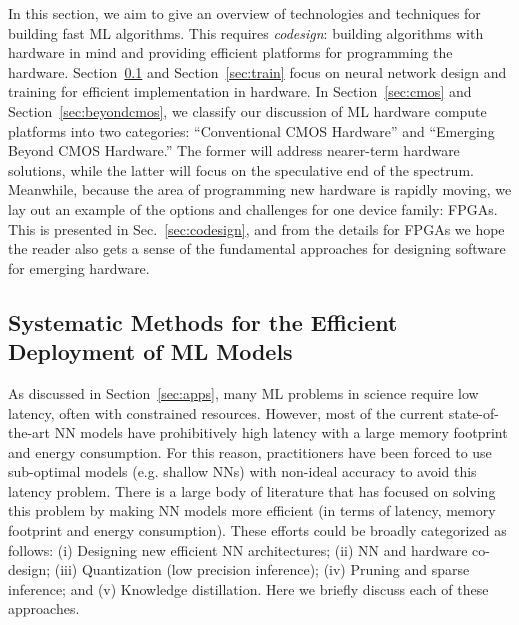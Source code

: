 In this section, we aim to give an overview of technologies and techniques for building fast ML algorithms. 
This requires {\it codesign}: building algorithms with hardware in mind and providing efficient platforms for programming the hardware.  Section~\ref{sec:deploy} and Section~\ref{sec:train} focus on neural network design and training for efficient implementation in hardware. 
In Section~\ref{sec:cmos} and Section~\ref{sec:beyondcmos}, we classify our discussion of ML hardware compute platforms into two categories: ``Conventional CMOS Hardware'' and ``Emerging Beyond CMOS Hardware.''  
The former will address nearer-term hardware solutions, while the latter will focus on the speculative end of the spectrum. Meanwhile, because the area of programming new hardware is rapidly moving, we lay out an example of the options and challenges for one device family: FPGAs. 
This is presented in Sec.~\ref{sec:codesign}, and from the details for FPGAs we hope the reader also gets a sense of the fundamental approaches for designing software for emerging hardware.   


\subsection{Systematic Methods for the Efficient Deployment of ML Models}
\label{sec:deploy}

As discussed in Section~\ref{sec:apps}, many ML problems in science
require low latency, often with
constrained resources. However, most of the current state-of-the-art NN models have prohibitively high latency with a large
memory footprint and energy consumption. 
For this reason, practitioners have been forced to use sub-optimal models (e.g. shallow NNs)
with non-ideal accuracy to avoid this latency problem.
There is a large body of literature that has
focused on solving this problem by making NN models more efficient
(in terms of latency, memory footprint and energy consumption). These efforts could be broadly categorized as follows:
(i) Designing new efficient NN architectures;
(ii) NN and hardware co-design;
(iii) Quantization (low precision inference);
(iv) Pruning and sparse inference; and
(v) Knowledge distillation.
Here we briefly discuss each of these approaches.


